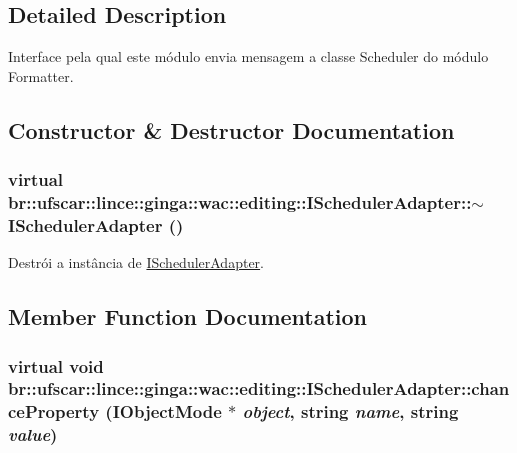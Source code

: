 \subsection{Detailed Description}
Interface pela qual este módulo envia mensagem a classe Scheduler do módulo Formatter. 

\subsection{Constructor \& Destructor Documentation}
\hypertarget{classbr_1_1ufscar_1_1lince_1_1ginga_1_1wac_1_1editing_1_1ISchedulerAdapter_a907bf3b317e57ea1ceb2512d40581070}{
\subsubsection[{$\sim$ISchedulerAdapter}]{\setlength{\rightskip}{0pt plus 5cm}virtual br::ufscar::lince::ginga::wac::editing::ISchedulerAdapter::$\sim$ISchedulerAdapter ()}}
\label{classbr_1_1ufscar_1_1lince_1_1ginga_1_1wac_1_1editing_1_1ISchedulerAdapter_a907bf3b317e57ea1ceb2512d40581070}


Destrói a instância de \hyperlink{classbr_1_1ufscar_1_1lince_1_1ginga_1_1wac_1_1editing_1_1ISchedulerAdapter}{ISchedulerAdapter}. 



\subsection{Member Function Documentation}
\hypertarget{classbr_1_1ufscar_1_1lince_1_1ginga_1_1wac_1_1editing_1_1ISchedulerAdapter_a689421a01c70c7915af5a03ee7fc681a}{
\subsubsection[{chanceProperty}]{\setlength{\rightskip}{0pt plus 5cm}virtual void br::ufscar::lince::ginga::wac::editing::ISchedulerAdapter::chanceProperty ({\bf IObjectMode} $\ast$ {\em object}, \/  string {\em name}, \/  string {\em value})}}
\label{classbr_1_1ufscar_1_1lince_1_1ginga_1_1wac_1_1editing_1_1ISchedulerAdapter_a689421a01c70c7915af5a03ee7fc681a}


